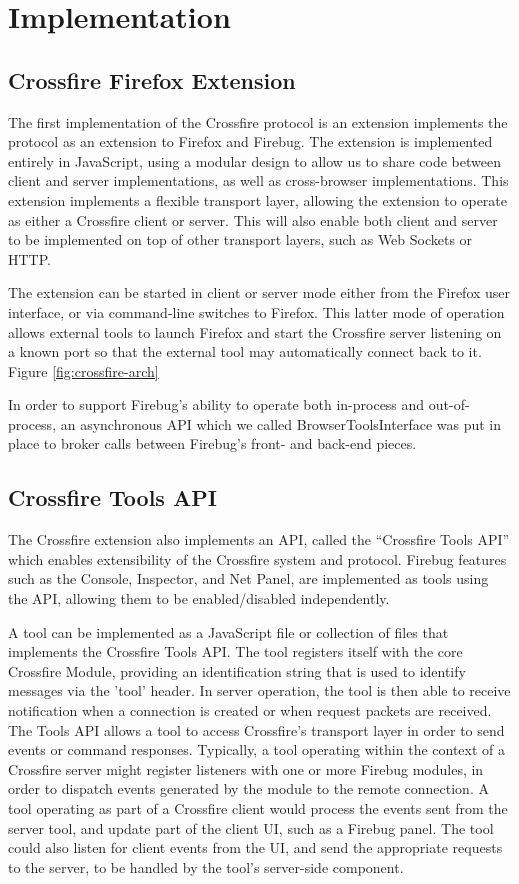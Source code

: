 \section{Implementation}

\subsection{Crossfire Firefox Extension}
The first implementation of the Crossfire protocol is an extension implements
the protocol as an extension to Firefox and Firebug. The extension is
implemented entirely in JavaScript, using a modular design to allow us to share
code between client and server implementations, as well as cross-browser
implementations. This extension implements a flexible transport layer, allowing
the extension to operate as either a Crossfire client or server. This will also
enable both client and server to be implemented on top of other transport
layers, such as Web Sockets or HTTP.

The extension can be started in client or server mode either from the Firefox
user interface, or via command-line switches to Firefox. This latter mode of
operation allows external tools to launch Firefox and start the Crossfire server
listening on a known port so that the external tool may automatically connect
back to it. Figure \ref{fig:crossfire-arch}

In order to support Firebug's ability to operate both in-process and
out-of-process, an asynchronous API which we called BrowserToolsInterface was
put in place to broker calls between Firebug's front- and back-end pieces.

\subsection{Crossfire Tools API}
The Crossfire extension also implements an API, called the ``Crossfire Tools
API'' which enables extensibility of the Crossfire system and protocol. Firebug
features such as the Console, Inspector, and Net Panel, are implemented as tools
using the API, allowing them to be enabled/disabled independently.

A tool can be implemented as a JavaScript file or collection of files that
implements the Crossfire Tools API. The tool registers itself with the core
Crossfire Module, providing an identification string that is used to identify
messages via the 'tool' header. In server operation, the tool is then able to
receive notification when a connection is created or when request packets are
received. The Tools API allows a tool to access Crossfire's transport layer in
order to send events or command responses.  Typically, a tool operating within
the context of a Crossfire server might register listeners with one or more
Firebug modules, in order to dispatch events generated by the module to the
remote connection. A tool operating as part of a Crossfire client would process
the events sent from the server tool, and update part of the client UI, such as
a Firebug panel. The tool could also listen for client events from the UI, and
send the appropriate requests to the server, to be handled by the tool's
server-side component.

